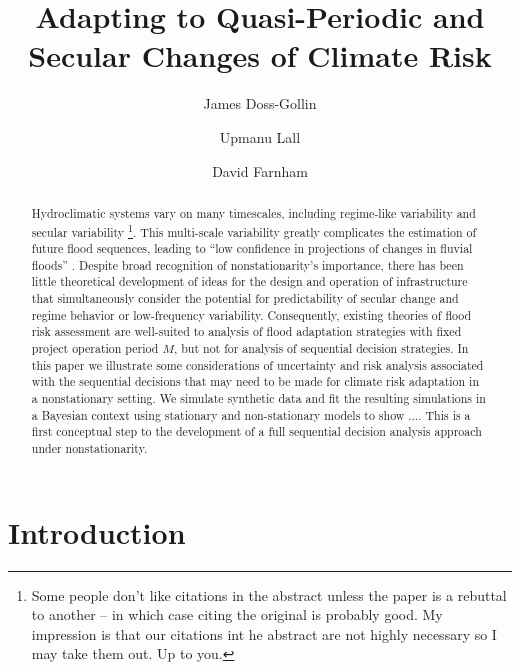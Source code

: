 \documentclass[12pt]{article}
\title{Adapting to Quasi-Periodic and Secular Changes of Climate Risk}
\author[1,2]{James Doss-Gollin}
\author[1,2]{Upmanu Lall}
\author[1,2]{David Farnham}
\affil[1]{Columbia Water Center, Columbia University}
\affil[2]{Department of Earth and Environmental Engineering, Columbia University}
\begin{document}
\maketitle
\RaggedRight{}
\begin{abstract}
  Hydroclimatic systems vary on many timescales, including regime-like variability and secular variability  \citep[``nonstationarity'';][]{Milly2008,Merz2014,Hodgkins2017}\footnote{Some people don't like citations in the abstract unless the paper is a rebuttal to another -- in which case citing the original is probably good. My impression is that our citations int he abstract are not highly necessary so I may take them out. Up to you.}.
  This multi-scale variability greatly complicates the estimation of future flood sequences, leading to ``low confidence in projections of changes in fluvial floods'' \citep{IPCC2012}.
  Despite broad recognition of nonstationarity's importance, there has been little theoretical development of ideas for the design and operation of infrastructure that simultaneously consider the potential for predictability of secular change and regime behavior or low-frequency variability.
  Consequently, existing theories of flood risk assessment are well-suited to analysis of flood adaptation strategies with fixed project operation period $M$, but not for analysis of sequential decision strategies.
  In this paper we illustrate some considerations of uncertainty and risk analysis associated with the sequential decisions that may need to be made for climate risk adaptation in a nonstationary setting.
  We simulate synthetic data and fit the resulting simulations in a Bayesian context using stationary and non-stationary models to show \(\ldots{}\).
  This is a first conceptual step to the development of a full sequential decision analysis approach under nonstationarity.
\end{abstract}


\section{Introduction}
\end{document}
